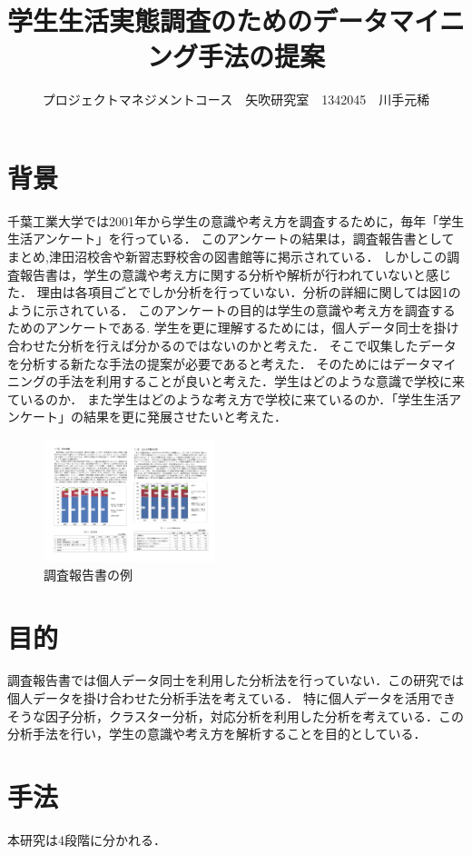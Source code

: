 \documentclass[uplatex,twocolumn,dvipdfmx]{jsarticle}
\title{\vspace{-5mm}\fontsize{14pt}{0pt}\selectfont 学生生活実態調査のためのデータマイニング手法の提案}
\author{\normalsize プロジェクトマネジメントコース　矢吹研究室　1342045　川手元稀}
\date{}
\begin{document}
\fontsize{10.5pt}{\baselineskip}\selectfont
\maketitle





\section{背景}
千葉工業大学では2001年から学生の意識や考え方を調査するために，毎年「学生生活アンケート」を行っている．
このアンケートの結果は，調査報告書としてまとめ,津田沼校舎や新習志野校舎の図書館等に掲示されている．
しかしこの調査報告書は，学生の意識や考え方に関する分析や解析が行われていないと感じた．
理由は各項目ごとでしか分析を行っていない．分析の詳細に関しては図1のように示されている．
このアンケートの目的は学生の意識や考え方を調査するためのアンケートである\cite{a}.
学生を更に理解するためには，個人データ同士を掛け合わせた分析を行えば分かるのではないのかと考えた．
そこで収集したデータを分析する新たな手法の提案が必要であると考えた．
そのためにはデータマイニングの手法を利用することが良いと考えた．学生はどのような意識で学校に来ているのか．
また学生はどのような考え方で学校に来ているのか．「学生生活アンケート」の結果を更に発展させたいと考えた．

\begin{figure}[htbp]
  \includegraphics[width=5cm]{questionnairesurvey.pdf}
\caption{調査報告書の例}\label{調査報告書}
\end{figure}

\section{目的}
調査報告書では個人データ同士を利用した分析法を行っていない．この研究では個人データを掛け合わせた分析手法を考えている．
特に個人データを活用できそうな因子分析，クラスター分析，対応分析を利用した分析を考えている．この分析手法を行い，学生の意識や考え方を解析することを目的としている．
\section{手法}
本研究は4段階に分かれる．
\end{document}
